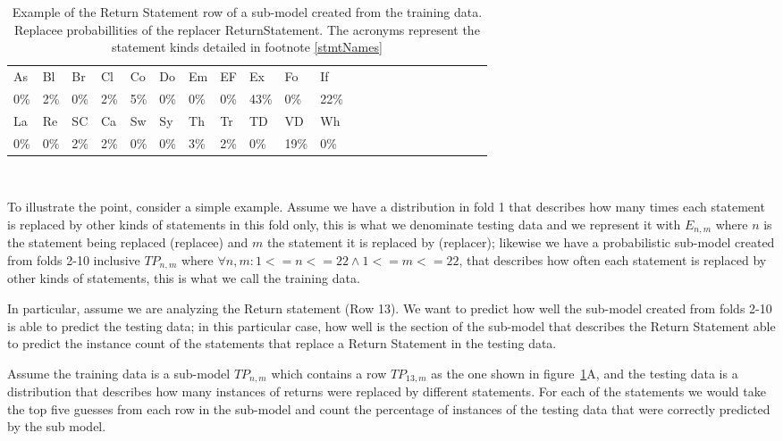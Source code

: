 \documentclass[conference]{IEEEtran}
\begin{document}
\begin{table}[ht]
\begin{tabular}{llllllllllllllllllllll}
\hline
As & Bl & Br & Cl & Co & Do & Em & EF & Ex & Fo & If \\
0\%&2\%&0\%&2\%&5\%&0\%&0\%&0\%&43\%&0\%&22\% \\
\hline 
La & Re & SC & Ca & Sw & Sy & Th & Tr & TD & VD & Wh \\
0\%&0\%&2\%&2\%&0\%&0\%&3\%&2\%&0\%&19\%&0\% \\
\hline
\end{tabular}
\\
\caption{Example of the Return Statement row of a sub-model created from 
the training data. Replacee probabillities of the replacer ReturnStatement. The acronyms represent the statement kinds detailed in footnote \ref{stmtNames}}
 \label{fig:exPredReturn} 
\end{table} 

% 

To illustrate the point, consider a simple example. Assume we have a 
distribution in fold 1 that describes how many times each statement is replaced 
by other kinds of statements in this fold 
only, this is what we denominate testing data and we represent it with $E_{n,m}$ 
where $n$ is the statement being replaced (replacee) and $m$ the statement it is 
replaced by (replacer); likewise we have a probabilistic sub-model created from 
folds 2-10 inclusive $TP_{n,m}$ where $\forall n,m: 1<=n<=22 \land 1<=m<=22$, 
that describes how often each statement is replaced by 
other kinds of statements, this is what we call the training data. 

In 
particular, assume we are analyzing the Return statement (Row 13). We want to 
predict 
how well the sub-model created from folds 2-10 is able to predict the testing 
data; in this particular case, how well is the section of the sub-model that 
describes the Return Statement able to predict the instance count of the 
statements that replace a Return Statement in the testing data.

Assume the training data is a sub-model $TP_{n,m}$ which contains a row 
$TP_{13,m}$ as the one shown in figure~\ref{fig:exPredReturn}A, and the testing data is a distribution that describes 
how many instances of returns were replaced by different statements.
For each of the statements we would take the top five guesses from each row in 
the sub-model and count the percentage of instances of the testing data that were correctly 
predicted by the sub model. 
\end{document}
